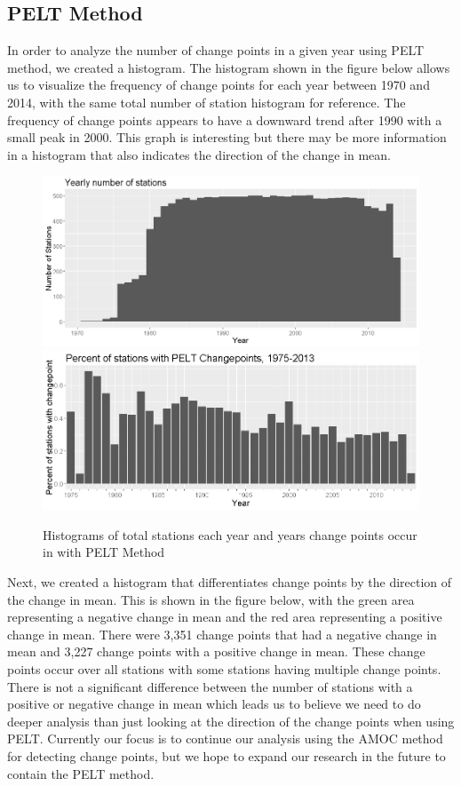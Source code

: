 \documentclass[11pt, oneside]{article}
\theoremstyle{definition}
\begin{document}
\subsection{PELT Method}
In order to analyze the number of change points in a given year using PELT method, we created a histogram. The histogram shown in the figure below allows us to visualize the frequency of change points for each year between 1970 and 2014, with the same total number of station histogram for reference. The frequency of change points appears to have a downward trend after 1990 with a small peak in 2000. This graph is interesting but there may be more information in a histogram that also indicates the direction of the change in mean.
\begin{figure}[ht]
    \centering
    \includegraphics[width=0.7\linewidth]{plots/total_stations.png}
    \includegraphics[width=0.7\linewidth]{plots/pelt_hist_relative.png}
    \caption{Histograms of total stations each year and years change points occur in with PELT Method}
    \label{pelt_hist_rel}
\end{figure} \newline
Next, we created a histogram that differentiates change points by the direction of the change in mean. This is shown in the figure below, with the green area representing a negative change in mean and the red area representing a positive change in mean. There were 3,351 change points that had a negative change in mean and 3,227 change points with a positive change in mean. These change points occur over all stations with some stations having multiple change points. There is not a significant difference between the number of stations with a positive or negative change in mean which leads us to believe we need to do deeper analysis than just looking at the direction of the change points when using PELT. Currently our focus is to continue our analysis using the AMOC method for detecting change points, but we hope to expand our research in the future to contain the PELT method. 
\end{document}
